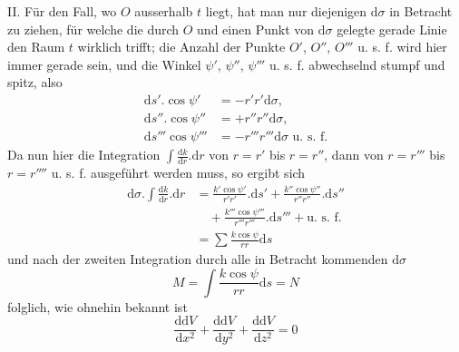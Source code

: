 II. Für den Fall, wo $O$ ausserhalb $t$ liegt, hat man nur diejenigen $\mathrm{d}\sigma$ in Betracht zu ziehen, für welche die durch $O$ und einen Punkt von $\mathrm{d}\sigma$ gelegte gerade Linie den Raum $t$ wirklich trifft; die Anzahl der Punkte $O'$, $O''$, $O'''$ u. s. f. wird hier immer gerade sein, und die Winkel $\psi'$, $\psi''$, $\psi'''$ u. s. f. abwechselnd stumpf und spitz, also
\[
\begin{aligned}
\mathrm{d}s'.\cos\psi'&=-r'r'\mathrm{d}\sigma,\\
\mathrm{d}s''.\cos\psi''&=+r''r''\mathrm{d}\sigma,\\
\mathrm{d}s'''\cos\psi'''&=-r'''r'''\mathrm{d}\sigma\text{ u. s. f.}
\end{aligned}
\]
Da nun hier die Integration $\int\frac{\mathrm{d}k}{\mathrm{d}r}.\mathrm{d}r$ von $r=r'$ bis $r=r''$, dann von $r=r'''$
%
bis $r=r''''$ u. s. f. ausgeführt werden muss, so ergibt sich
\[
\begin{aligned}
\mathrm{d}\sigma.\int\frac{\mathrm{d}k}{\mathrm{d}r}.\mathrm{d}r&=\frac{k'\cos\psi'}{r'r'}.\mathrm{d}s'+\frac{k''\cos\psi''}{r''r''}.\mathrm{d}s''\\
&\quad{}+\frac{k'''\cos\psi'''}{r'''r'''}.\mathrm{d}s'''+\text{u. s. f.}\\
&=\sum\frac{k\cos\psi}{rr}\mathrm{d}s
\end{aligned}
\]
und nach der zweiten Integration durch alle in Betracht kommenden $\mathrm{d}\sigma$
\[
M=\int\frac{k\cos\psi}{rr}\mathrm{d}s=N
\]
folglich, wie ohnehin bekannt ist
\[
\frac{\mathrm{d}\mathrm{d}V}{\mathrm{d}x^2}+\frac{\mathrm{d}\mathrm{d}V}{\mathrm{d}y^2}+\frac{\mathrm{d}\mathrm{d}V}{\mathrm{d}z^2}=0
\]

